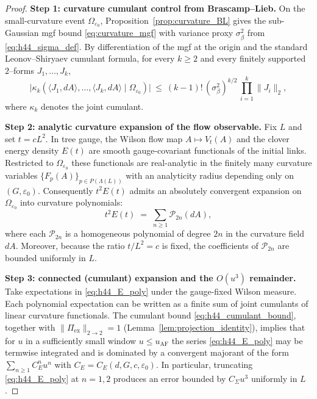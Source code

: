 \begin{proof}
\textbf{Step 1: curvature cumulant control from Brascamp--Lieb.}
On the small-curvature event $\Omega_{\varepsilon_0}$, Proposition~\ref{prop:curvature_BL} gives the sub-Gaussian mgf bound
\eqref{eq:curvature_mgf} with variance proxy $\sigma_\beta^2$ from \eqref{eq:h44_sigma_def}.
By differentiation of the mgf at the origin and the standard Leonov--Shiryaev cumulant formula,
for every $k\ge 2$ and every finitely supported $2$--forms $J_1,\dots,J_k$,
\begin{equation}\label{eq:h44_cumulant_bound}
\bigl|\kappa_k(\langle J_1,dA\rangle,\dots,\langle J_k,dA\rangle\mid \Omega_{\varepsilon_0})\bigr|
\ \le\ (k-1)!\,(\sigma_\beta^2)^{k/2}\,\prod_{i=1}^k\|J_i\|_2,
\end{equation}
where $\kappa_k$ denotes the joint cumulant.

\smallskip
\textbf{Step 2: analytic curvature expansion of the flow observable.}
Fix $L$ and set $t=cL^2$.
In tree gauge, the Wilson flow map $A\mapsto V_t(A)$ and the clover energy density $E(t)$ are smooth gauge-covariant functionals of the initial
links.
Restricted to $\Omega_{\varepsilon_0}$ these functionals are real-analytic in the finitely many curvature variables
$\{F_p(A)\}_{p\in P(\Lambda(L))}$ with an analyticity radius depending only on $(G,\varepsilon_0)$.
Consequently $t^2E(t)$ admits an absolutely convergent expansion on $\Omega_{\varepsilon_0}$ into curvature polynomials:
\begin{equation}\label{eq:h44_E_poly}
t^2E(t)\;=\;\sum_{n\ge 1}\mathcal P_{2n}(dA),
\end{equation}
where each $\mathcal P_{2n}$ is a homogeneous polynomial of degree $2n$ in the curvature field $dA$.
Moreover, because the ratio $t/L^2=c$ is fixed, the coefficients of $\mathcal P_{2n}$ are bounded uniformly in $L$.

\smallskip
\textbf{Step 3: connected (cumulant) expansion and the $O(u^3)$ remainder.}
Take expectations in \eqref{eq:h44_E_poly} under the gauge-fixed Wilson measure.
Each polynomial expectation can be written as a finite sum of joint cumulants of linear curvature functionals.
The cumulant bound \eqref{eq:h44_cumulant_bound}, together with $\|\Pi_{\mathrm{ex}}\|_{2\to 2}=1$ (Lemma~\ref{lem:projection_identity}),
implies that for $u$ in a sufficiently small window $u\le u_{\mathrm{AF}}$ the series \eqref{eq:h44_E_poly} may be termwise
integrated and is dominated by a convergent majorant of the form $\sum_{n\ge 1}C_E^{n}u^{n}$ with $C_E=C_E(d,G,c,\varepsilon_0)$.
In particular, truncating \eqref{eq:h44_E_poly} at $n=1,2$ produces an error bounded by $C_{\Sigma}u^3$
uniformly in $L$.


\end{proof}
